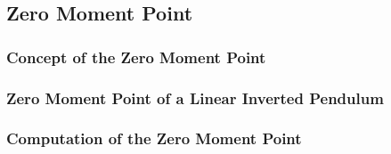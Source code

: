 \subsection{Zero Moment Point}
\label{sec::311_zmp}
\subsubsection{Concept of the Zero Moment Point}
\subsubsection{Zero Moment Point of a Linear Inverted Pendulum}
\subsubsection{Computation of the Zero Moment Point}

